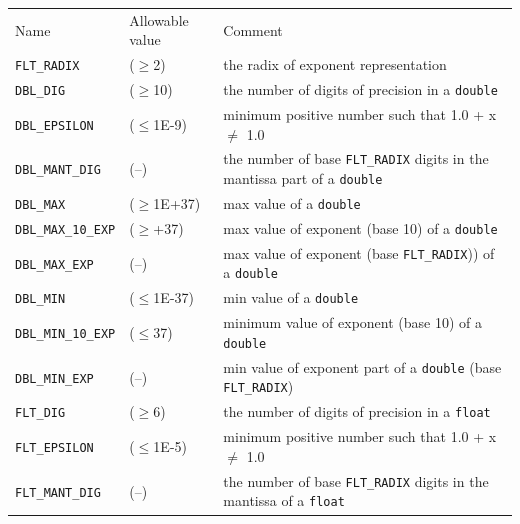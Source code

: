    \begin{tabular}{llp{\textwidth}}
     Name & Allowable value & Comment
    \\

     \texttt{FLT\_RADIX} & ($\geq$2) & the radix of exponent representation
    \\

     \texttt{DBL\_DIG} & ($\geq$10) & the number of digits of precision in a \texttt{double}
    \\

     \texttt{DBL\_EPSILON} & ($\leq$1E-9) & minimum positive number such that 1.0 + x $\neq$ 1.0
    \\

     \texttt{DBL\_MANT\_DIG} & (--) & the number of base \texttt{FLT\_RADIX} digits in the mantissa part
      of a \texttt{double}
    \\

     \texttt{DBL\_MAX} & ($\geq$1E+37) & max value of a \texttt{double}
    \\

     \texttt{DBL\_MAX\_10\_EXP} & ($\geq$+37) & max value of exponent (base 10) of a \texttt{double}
    \\

     \texttt{DBL\_MAX\_EXP} & (--) & max value of exponent (base \texttt{FLT\_RADIX})) of a
      \texttt{double}
    \\

     \texttt{DBL\_MIN} & ($\leq$1E-37) & min value of a \texttt{double}
    \\

     \texttt{DBL\_MIN\_10\_EXP} & ($\leq$37) & minimum value of exponent (base 10) of a \texttt{double}
    \\

     \texttt{DBL\_MIN\_EXP} & (--) & min value of exponent part of a \texttt{double} (base
      \texttt{FLT\_RADIX})
    \\

     \texttt{FLT\_DIG} & ($\geq$6) & the number of digits of precision in a \texttt{float}
    \\

     \texttt{FLT\_EPSILON} & ($\leq$1E-5) & minimum positive number such that 1.0 + x $\neq$ 1.0
    \\

     \texttt{FLT\_MANT\_DIG} & (--) & the number of base \texttt{FLT\_RADIX} digits in the mantissa of a
      \texttt{float}
    \\


\end{tabular}
